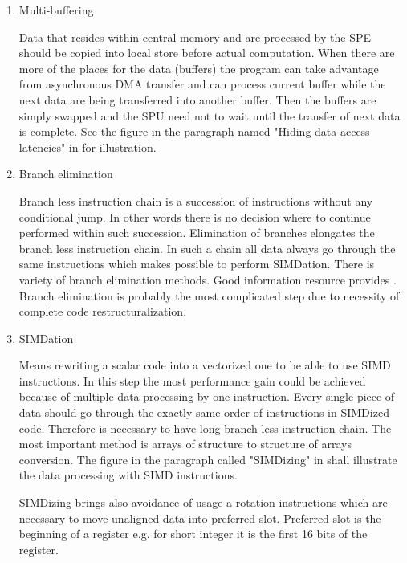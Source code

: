 \begin{enumerate}
\item{Multi-buffering}
\par
Data that resides within central memory and are processed by the SPE should be copied into local store before actual computation.
When there are more of the places for the data (buffers) the program can take advantage from asynchronous DMA transfer and can process current buffer while the next data are being transferred into another buffer.
Then the buffers are simply swapped and the SPU need not to wait until the transfer of next data is complete.
See the figure in the paragraph named "Hiding data-access latencies" in \cite{compilerOptions} for illustration.

\item{Branch elimination}
\par
Branch less instruction chain is a succession of instructions without any conditional jump.
In other words there is no decision where to continue performed within such succession.
Elimination of branches elongates the branch less instruction chain.
In such a chain all data always go through the same instructions which makes possible to perform SIMDation.
There is variety of branch elimination methods.
Good information resource provides \cite{cellPerformance}.
Branch elimination is probably the most complicated step due to necessity of complete code restructuralization.

\item{SIMDation}
\par
Means rewriting a scalar code into a vectorized one to be able to use SIMD instructions.
In this step the most performance gain could be achieved because of multiple data processing by one instruction.
Every single piece of data should go through the exactly same order of instructions in SIMDized code.
Therefore is necessary to have long branch less instruction chain.
The most important method is arrays of structure to structure of arrays conversion.
The figure in the paragraph called "SIMDizing" in \cite{compilerOptions} shall illustrate the data processing with SIMD instructions.

\par
SIMDizing brings also avoidance of usage a rotation instructions which are necessary to move unaligned data into preferred slot.
Preferred slot is the beginning of a register e.g. for short integer it is the first 16 bits of the register.


\end{enumerate}
